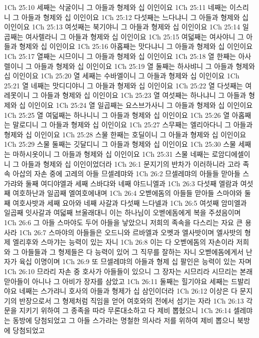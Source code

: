 1Ch 25:10  세째는 삭굴이니 그 아들과 형제와 십 이인이요
1Ch 25:11  네째는 이스리니 그 아들과 형제와 십 이인이요
1Ch 25:12  다섯째는 느다냐니 그 아들과 형제와 십 이인이요
1Ch 25:13  여섯째는 북기야니 그 아들과 형제와 십 이인이요
1Ch 25:14  일곱째는 여사렐라니 그 아들과 형제와 십 이인이요
1Ch 25:15  여덟째는 여사야니 그 아들과 형제와 십 이인이요
1Ch 25:16  아홉째는 맛다냐니 그 아들과 형제와 십 이인이요
1Ch 25:17  열째는 시므이니 그 아들과 형제와 십 이인이요
1Ch 25:18  열 한째는 아사렐이니 그 아들과 형제와 십 이인이요
1Ch 25:19  열 둘째는 하사뱌니 그 아들과 형제와 십 이인이요
1Ch 25:20  열 세째는 수바엘이니 그 아들과 형제와 십 이인이요
1Ch 25:21  열 네째는 맛디디야니 그 아들과 형제와 십 이인이요
1Ch 25:22  열 다섯째는 여레못이니 그 아들과 형제와 십 이인이요
1Ch 25:23  열 여섯째는 하나냐니 그 아들과 형제와 십 이인이요
1Ch 25:24  열 일곱째는 요스브가사니 그 아들과 형제와 십 이인이요
1Ch 25:25  열 여덟째는 하나니니 그 아들과 형제와 십 이인이요
1Ch 25:26  열 아홉째는 말로디니 그 아들과 형제와 십 이인이요
1Ch 25:27  스무째는 엘리아다니 그 아들과 형제와 십 이인이요
1Ch 25:28  스물 한째는 호딜이니 그 아들과 형제와 십 이인이요
1Ch 25:29  스물 둘째는 깃달디니 그 아들과 형제와 십 이인이요
1Ch 25:30  스물 세째는 마하시옷이니 그 아들과 형제와 십 이인이요
1Ch 25:31  스물 네째는 로암디에셀이니 그 아들과 형제와 십 이인이었더라
1Ch 26:1  문지기의 반차가 이러하니라 고라 족속 아삽의 자손 중에 고레의 아들 므셀레먀와
1Ch 26:2  므셀레먀의 아들들 맏아들 스가랴와 둘째 여디야엘과 세째 스바댜와 네째 야드니엘과
1Ch 26:3  다섯째 엘람과 여섯째 여호하난과 일곱째 엘여호에내며
1Ch 26:4  오벧에돔의 아들들 맏아들 스마야와 둘째 여호사밧과 세째 요아와 네째 사갈과 다섯째 느다넬과
1Ch 26:5  여섯째 암미엘과 일곱째 잇사갈과 여덟째 브울래대니 이는 하나님이 오벧에돔에게 복을 주셨음이며
1Ch 26:6  그 아들 스마야도 두어 아들을 낳았으니 저희의 족속을 다스리는 자요 큰 용사라
1Ch 26:7  스마야의 아들들은 오드니와 르바엘과 오벳과 엘사밧이며 엘사밧의 형제 엘리후와 스마갸는 능력이 있는 자니
1Ch 26:8  이는 다 오벧에돔의 자손이라 저희와 그 아들들과 그 형제들은 다 능력이 있어 그 직무를 잘하는 자니 오벧에돔에게서 난 자가 육십 이명이며
1Ch 26:9  또 므셀레먀의 아들과 형제 십 팔인은 능력이 있는 자며
1Ch 26:10  므라리 자손 중 호사가 아들들이 있으니 그 장자는 시므리라 시므리는 본래 맏아들이 아니나 그 아비가 장자를 삼았고
1Ch 26:11  둘째는 힐기야요 세째는 드발리야요 네째는 스가랴니 호사의 아들과 형제가 십 삼인이더라
1Ch 26:12  이상은 다 문지기의 반장으로서 그 형제처럼 직임을 얻어 여호와의 전에서 섬기는 자라
1Ch 26:13  각 문을 지키기 위하여 그 종족을 따라 무론대소하고 다 제비 뽑혔으니
1Ch 26:14  셀레먀는 동방에 당첨되었고 그 아들 스가랴는 명철한 의사라 저를 위하여 제비 뽑으니 북방에 당첨되었고
